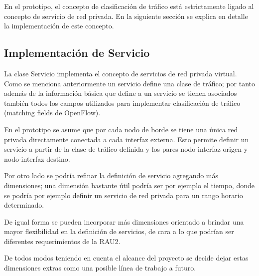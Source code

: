 En el prototipo, el concepto de clasificaci\'on de tr\'afico est\'a estrictamente ligado al concepto de servicio de red privada. En la siguiente secci\'on se explica en detalle la implementaci\'on de este concepto.
 
\subsection{Implementación de Servicio}

La clase Servicio implementa el concepto de servicios de red privada virtual. Como se menciona anteriormente un servicio define una clase de tr\'afico; por tanto adem\'as de la informaci\'on b\'asica que define a un servicio se tienen asociados tambi\'en todos los campos utilizados para implementar clasificaci\'on de tr\'afico (matching fields de OpenFlow).

En el prototipo se asume que por cada nodo de borde  se tiene una \'unica red privada directamente conectada a cada interfaz externa. Esto permite definir un servicio a partir de la clase de tr\'afico definida y los pares nodo-interfaz origen y nodo-interfaz destino.

Por otro lado se podr\'ia refinar la definici\'on de servicio agregando m\'as dimensiones; una dimensi\'on bastante \'util podr\'ia ser por ejemplo el tiempo, donde se podr\'ia por ejemplo definir un servicio de red privada para un rango horario determinado.

De igual forma se pueden incorporar m\'as dimensiones orientado a brindar una mayor flexibilidad en la definici\'on de servicios, de cara a lo que podr\'ian ser diferentes requerimientos de la RAU2. 

De todos modos teniendo en cuenta el alcance del proyecto se decide dejar estas dimensiones extras como una posible l\'inea de trabajo a futuro.\\ 






